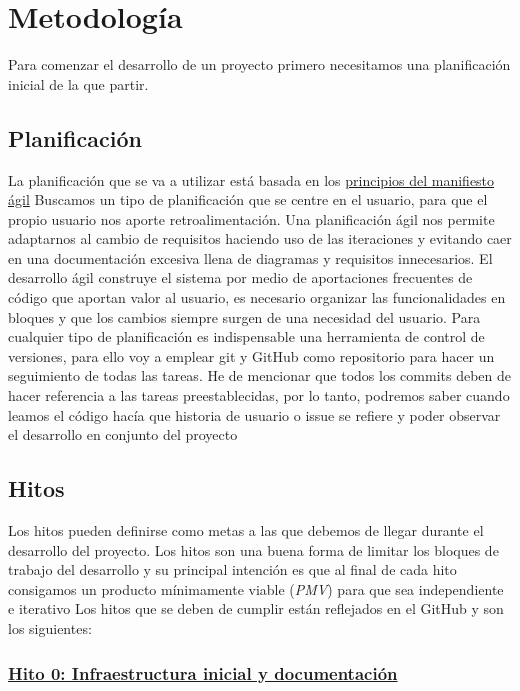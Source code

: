 \UseRawInputEncoding
\chapter{Metodología}

Para comenzar el desarrollo de un proyecto primero necesitamos una planificación inicial de la que partir.

\section{Planificación}

La planificación que se va a utilizar está basada en los {\href{https://agilemanifesto.org/iso/es/principles.html}{principios del manifiesto ágil}}
Buscamos un tipo de planificación que se centre en el usuario, para que el propio usuario nos aporte retroalimentación.
Una planificación ágil nos permite adaptarnos al cambio de requisitos haciendo uso de las iteraciones y
evitando caer en una documentación excesiva llena de diagramas y requisitos innecesarios.
El desarrollo ágil construye el sistema por medio de aportaciones frecuentes de código que aportan valor
al usuario, es necesario organizar las funcionalidades en bloques y que los cambios siempre surgen de una
necesidad del usuario.
Para cualquier tipo de planificación es indispensable una herramienta de control de versiones, para ello voy a emplear  git
y GitHub como repositorio para hacer un seguimiento de todas las tareas.
He de mencionar que todos los commits deben de hacer referencia a las tareas preestablecidas, por lo tanto,
podremos saber cuando leamos el código hacía que historia de usuario o issue se refiere
y poder observar el desarrollo en conjunto del proyecto

\section{Hitos}
Los hitos pueden definirse como metas a las que debemos de llegar durante el desarrollo del proyecto.
Los hitos son una buena forma de limitar los bloques de trabajo del desarrollo y su principal intención es que
al final de cada hito consigamos un producto mínimamente viable (\textit{PMV}) para que sea independiente e iterativo
Los hitos que se deben de cumplir están reflejados en el GitHub y son los siguientes:

\subsection*{\href{https://github.com/RubenDelgadoPareja/TFG-Triage-Inteligente-Consulta-Medica/milestone/1}{Hito 0: Infraestructura inicial y documentación}}

